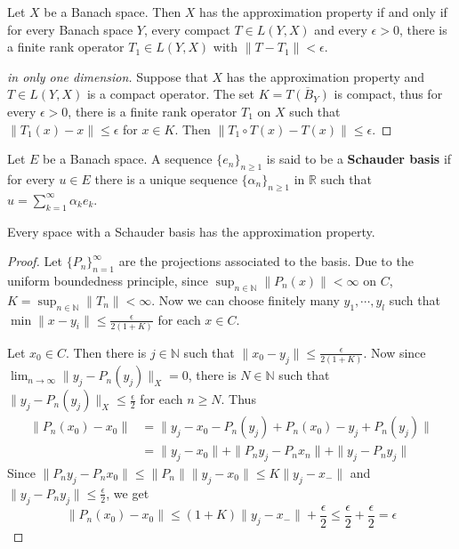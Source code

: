 \begin{thm} Let $X$ be a Banach space. Then $X$ has the approximation property if and only if for every Banach space $Y$, every compact $T\in L(Y,X)$ and every $\epsilon>0$, there is a finite rank operator $T_1\in L(Y,X)$ with $\|T-T_1\|<\epsilon$.
\end{thm}
\begin{proof}[in only one dimension] Suppose that $X$ has the approximation property and $T\in L(Y,X)$ is a compact operator. The set $K=\overline{T(B_Y)}$ is compact, thus for every $\epsilon>0$, there is a finite rank operator $T_1$ on $X$ such that $\|T_1(x)-x\|\leq \epsilon$ for $x\in K$. Then $\|T_1\circ T(x)-T(x)\| \leq\epsilon$.
\end{proof}

\begin{defn} Let $E$ be a Banach space. A sequence $\{e_n\}_{n\geq 1}$ is said to be a \textbf{Schauder basis} if for every $u\in E$ there is a unique sequence $\{\alpha_n\}_{n\geq 1}$ in $\mathbb{R}$ such that $u=\sum_{k=1}^\infty \alpha_k e_k$.
\end{defn}

\begin{prop} Every space with a Schauder basis has the approximation property.
\end{prop}
\begin{proof} Let $\{P_n\}_{n=1}^\infty$ are the projections associated to the basis. Due to the uniform boundedness principle, since $\sup_{n\in \mathbb{N}} \|P_n (x)\|<\infty$ on $C$, $K=\sup_{n\in \mathbb{N}}\|T_n\|<\infty$. Now we can choose finitely many $y_1,\cdots,y_l$ such that $\min \|x-y_i\|\leq \frac{\epsilon}{2(1+K)}$ for each $x\in C$.

Let $x_0\in C$. Then there is $j\in \mathbb{N}$ such that $\|x_0-y_j\|\leq \frac{\epsilon}{2(1+K)}$. Now since $\lim_{n\rightarrow \infty} \|y_j-P_n(y_j)\|_X=0$, there is $N\in \mathbb{N}$ such that $\|y_j-P_n (y_j)\|_X\leq \frac{\epsilon}{2}$ for each $n\geq N$. Thus
\begin{align}
    \|P_n (x_0)-x_0\|&= \|y_j-x_0-P_n(y_j)+P_n(x_0)-y_j+P_n(y_j)\|\\
    &=\|y_j-x_0\|+\|P_ny_j-P_nx_n\|+\|y_j-P_ny_j\|
\end{align}
Since $\|P_n y_j-P_n x_0\|\leq \|P_n\| \|y_j-x_0\|\leq K\|y_j-x_-\|$ and $\|y_j-P_n y_j\|\leq \frac{\epsilon}{2}$, we get
\begin{equation}
    \|P_n (x_0)-x_0\|\leq (1+K)\|y_j-x_-\|+\frac{\epsilon}{2}\leq \frac{\epsilon}{2}+\frac{\epsilon}{2}=\epsilon
\end{equation}
\end{proof}

